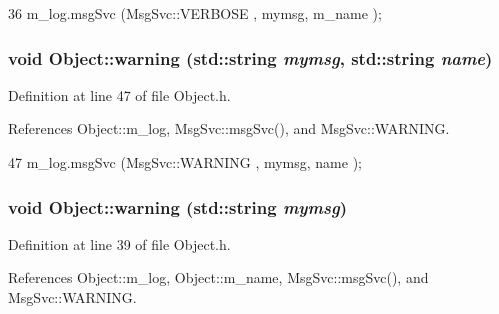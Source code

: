 \begin{DoxyCode}
36 { m_log.msgSvc (MsgSvc::VERBOSE , mymsg, m_name ); }
\end{DoxyCode}
\hypertarget{classObject_a11f101db4dd73d9391b0231818881d86}{
\subsubsection[{warning}]{\setlength{\rightskip}{0pt plus 5cm}void Object::warning (std::string {\em mymsg}, \/  std::string {\em name})}}
\label{classObject_a11f101db4dd73d9391b0231818881d86}


Definition at line 47 of file Object.h.

References Object::m\_\-log, MsgSvc::msgSvc(), and MsgSvc::WARNING.


\begin{DoxyCode}
47 { m_log.msgSvc (MsgSvc::WARNING , mymsg, name ); }
\end{DoxyCode}
\hypertarget{classObject_a65cd4fda577711660821fd2cd5a3b4c9}{
\subsubsection[{warning}]{\setlength{\rightskip}{0pt plus 5cm}void Object::warning (std::string {\em mymsg})}}
\label{classObject_a65cd4fda577711660821fd2cd5a3b4c9}


Definition at line 39 of file Object.h.

References Object::m\_\-log, Object::m\_\-name, MsgSvc::msgSvc(), and MsgSvc::WARNING.

